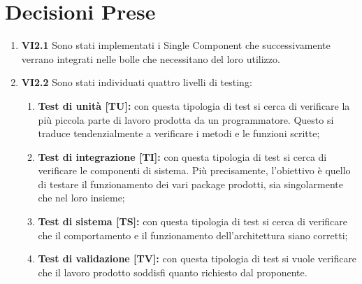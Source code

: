 \documentclass[10 pt,a4paper, openany]{article}
\begin{document}
\section{Decisioni Prese}
\begin{enumerate}
	\item \textbf{VI2.1} Sono stati implementati i Single Component che successivamente verrano integrati nelle bolle che necessitano del loro utilizzo.
	\item \textbf{VI2.2} Sono stati individuati quattro livelli di testing:
	\begin{enumerate}
		\item \textbf{Test di unità [TU]:} con questa tipologia di test si cerca di verificare la più piccola parte di lavoro prodotta da un programmatore. Questo si traduce tendenzialmente a verificare i metodi e le funzioni scritte;
		\item \textbf{Test di integrazione [TI]:} con questa tipologia di test si cerca di verificare le componenti di sistema. Più precisamente, l'obiettivo è quello di testare il funzionamento dei vari package prodotti, sia singolarmente che nel loro insieme;
		\item \textbf{Test di sistema [TS]:} con questa tipologia di test si cerca di verificare che il comportamento e il funzionamento dell'architettura siano corretti;
		\item \textbf{Test di validazione [TV]:} con questa tipologia di test si vuole verificare che il lavoro prodotto soddisfi quanto richiesto dal proponente.
	\end{enumerate}

\end{enumerate}
\end{document}
